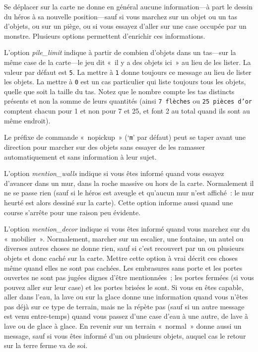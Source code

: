 \documentclass[titlepage]{article}
\begin{document}
Se déplacer sur la carte ne donne en général aucune information---à part
le dessin du héros à sa nouvelle position---sauf si vous marchez sur un
objet ou un tas d'objets, ou sur un piège, ou si vous essayez d'aller sur
une case occupée par un monstre.
Plusieurs options permettent d'enrichir ces informations.


L'option
\textit{pile\_limit}
indique à partir de combien d'objets dans un tas---sur la même case de la
carte---le jeu dit «~il y a des objets ici~» au lieu de les lister.
La valeur par défaut est \texttt{5}.
La mettre à \texttt{1} donne toujours ce message au lieu de lister les
objets.
La mettre à \texttt{0} est un cas particulier qui liste toujours tous les
objets, quelle que soit la taille du tas.
Notez que le nombre compte les tas distincts présents et non la somme de
leurs quantités (ainsi \texttt{7 flèches} ou \texttt{25 pièces d'or} comptent
chacun pour 1 et non pour 7 et 25, et font 2 au total quand ils sont au
même endroit).


Le préfixe de commande «~nopickup~» (`\texttt{m}' par défaut)
peut se taper avant une direction pour marcher sur des objets sans essayer
de les ramasser automatiquement et sans information à leur sujet.


L'option
\textit{mention\_walls}
indique si vous êtes informé quand vous essayez d'avancer dans un mur, dans
la roche massive ou hors de la carte.
Normalement il ne se passe rien (sauf si le héros est aveugle et qu'aucun
mur n'est affiché~: le mur heurté est alors dessiné sur la carte).
Cette option informe aussi quand une course s'arrête pour une raison peu
évidente.


L'option
\textit{mention\_decor}
indique si vous êtes informé quand vous marchez sur du «~mobilier~».
Normalement, marcher sur un escalier, une fontaine, un autel ou diverses
autres choses ne donne rien, sauf si c'est recouvert par un ou plusieurs
objets et donc caché sur la carte.
Mettre cette option à vrai décrit ces choses même quand elles ne sont pas
cachées.
Les embrasures sans porte et les portes ouvertes ne sont pas jugées dignes
d'être mentionnées~; les portes fermées (si vous pouvez aller sur leur
case) et les portes brisées le sont.
Si vous en êtes capable, aller dans l'eau, la lave ou sur la glace donne
une information quand vous n'êtes pas déjà sur ce type de terrain, mais ne
la répète pas (sauf si un autre message est venu entre-temps) quand vous
passez d'une case d'eau à une autre, de lave à lave ou de glace à glace.
En revenir sur un terrain «~normal~» donne aussi un message, sauf si
vous êtes informé d'un ou plusieurs objets, auquel cas le retour sur la
terre ferme va de soi.
\end{document}
